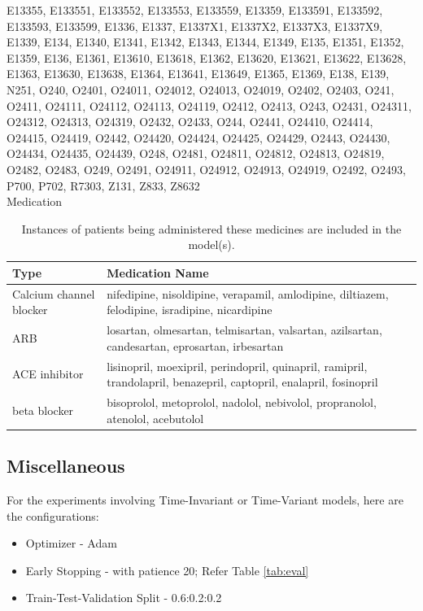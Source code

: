 \documentclass[%
 twocolumn,
 reprint,
 amsmath,amssymb,
 aps,nofootinbib
]{revtex4-2}
\begin{document}
E13355, E133551, E133552, E133553, E133559, E13359, E133591, E133592, E133593, E133599, E1336, E1337, E1337X1, E1337X2, E1337X3, E1337X9, E1339, E134, E1340, E1341, E1342, E1343, E1344, E1349, E135, E1351, E1352, E1359, E136, E1361, E13610, E13618, E1362, E13620, E13621, E13622, E13628, E1363, E13630, E13638, E1364, E13641, E13649, E1365, E1369, E138, E139, N251, O240, O2401, O24011, O24012, O24013, O24019, O2402, O2403, O241, O2411, O24111, O24112, O24113, O24119, O2412, O2413, O243, O2431, O24311, O24312, O24313, O24319, O2432, O2433, O244, O2441, O24410, O24414, O24415, O24419, O2442, O24420, O24424, O24425, O24429, O2443, O24430, O24434, O24435, O24439, O248, O2481, O24811, O24812, O24813, O24819, O2482, O2483, O249, O2491, O24911, O24912, O24913, O24919, O2492, O2493, P700, P702, R7303, Z131, Z833, Z8632\\

Medication\\

\begin{table}
  \centering
\begin{tabular}{|p{4cm}|p{7cm}|}
\hline
\textbf{Type} & \textbf{Medication Name}\\
\hline
Calcium channel blocker & nifedipine, nisoldipine, verapamil, amlodipine, diltiazem, felodipine, isradipine, nicardipine\\
\hline
ARB & losartan, olmesartan, telmisartan, valsartan, azilsartan, candesartan, eprosartan, irbesartan\\
\hline
ACE inhibitor & lisinopril, moexipril, perindopril, quinapril, ramipril, trandolapril, benazepril, captopril, enalapril, fosinopril\\
\hline
beta blocker & bisoprolol, metoprolol, nadolol, nebivolol, propranolol, atenolol, acebutolol\\
 \hline
  \end{tabular}
  \caption[Medication]{Instances of patients being administered these medicines are included in the model(s).}
  \label{tab:meds}
\end{table}

\subsection{\label{app:model_setup}Miscellaneous}
For the experiments involving Time-Invariant or Time-Variant models, here are the configurations:
\begin{itemize}
\item Optimizer - Adam
\item Early Stopping - with patience 20; Refer Table \ref{tab:eval}
\item Train-Test-Validation Split - 0.6:0.2:0.2
\end{itemize}
\end{document}
